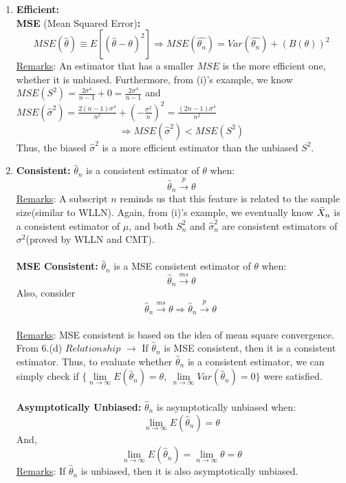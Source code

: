 \documentclass[a4paper,12pt]{article} %
\begin{document}
\begin{enumerate}
{\begin{enumerate}
{\begin{enumerate}
{        \\\\
        $\rightarrow$ {\bf MVUE} (Minimum Variance Unbiased Estimator): $\hat{\theta}$ is MVUE of $\theta$ $\Leftrightarrow E(\hat{\theta})=\theta,\ \forall\theta$ \\
        $\Leftrightarrow Var(\hat{\theta})\leq Var(\hat{\theta}^*),\ \forall \hat{\theta}^*,\ E(\hat{\theta}^*)=\theta$
        }
        \\
        \item {{\bf Efficient:} \\{\bf MSE} (Mean Squared Error){\bf :} $$ MSE(\hat{\theta})\equiv E[(\hat{\theta}-\theta)^2] \Rightarrow MSE(\hat{\theta_n})=Var(\hat{\theta_n})+ (B(\theta))^2 $$ 
        \underline{Remarks}: An estimator that has a smaller $MSE$ is the more efficient one, whether it is unbiased. Furthermore, from (i)'s example, we know  $MSE(S^2)=\frac{2\sigma^4}{n-1}+0=\frac{2\sigma^4}{n-1}$ and $MSE(\hat{\sigma}^2)=\frac{2(n-1)\sigma^4}{n^2}+(-\frac{\sigma^2}{n})^2 = \frac{(2n-1)\sigma^4}{n^2}$ $$\Rightarrow MSE(\hat{\sigma}^2)<MSE(S^2)$$ Thus, the biased $\hat{\sigma}^2$ is a more efficient estimator than the unbiased $S^2$.
        }\\
        \item {{\bf Consistent:} $\hat{\theta}_n$ is a consistent estimator of $\theta$ when: $$ \hat{\theta}_n \xrightarrow{p} \theta $$
        \underline{Remarks}: A subscript $n$ reminds us that this feature is related to the sample size(similar to WLLN). Again, from (i)'s example, we eventually know $\Bar{X}_n$ is a consistent estimator of $\mu$, and both $S_n^2$ and $\hat{\sigma}_n^2$ are consistent estimators of $\sigma^2$(proved by WLLN and CMT).\\\\
        {\bf MSE Consistent:} $\hat{\theta}_n$ is a MSE consistent estimator of $\theta$ when: $$ \hat{\theta}_n \xrightarrow{ms} \theta $$ Also, consider $$ \hat{\theta}_n \xrightarrow{ms} \theta \Rightarrow \hat{\theta}_n \xrightarrow{p} \theta\ $$\\
        \underline{Remarks}: MSE consistent is based on the idea of mean square convergence. From 6.(d) $Relationship$ $\rightarrow$ If $\hat{\theta}_n$ is MSE consistent, then it is a consistent estimator. Thus, to evaluate whether $\hat{\theta}_n$ is a consistent estimator, we can simply check if $\{\lim\limits_{n\rightarrow\infty}E(\hat{\theta}_n)=\theta,\ 
        \lim\limits_{n\rightarrow\infty} Var(\hat{\theta}_n)=0\}$ were satisfied. \\\\
        {\bf Asymptotically Unbiased:} $\hat{\theta}_n$ is asymptotically unbiased when: $$ \lim\limits_{n\rightarrow\infty}E(\hat{\theta}_n)=\theta $$ And, $$ \lim\limits_{n\rightarrow\infty}E(\hat{\theta}_n)= \lim\limits_{n\rightarrow\infty}\theta=\theta$$ \underline{Remarks}: If $\hat{\theta}_n$ is unbiased, then it is also asymptotically unbiased.
        }
    \end{enumerate}
    }
    

\end{enumerate}}
\end{enumerate}
\end{document}
